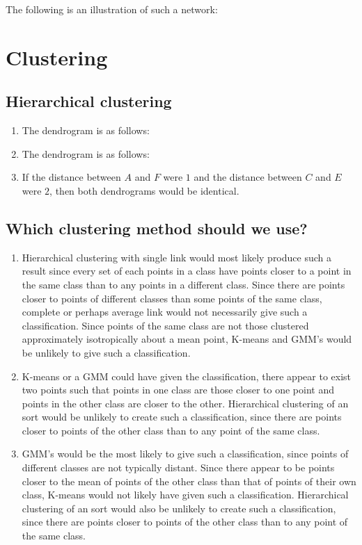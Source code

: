 \documentclass[11pt]{article}
\begin{document}
The following is an illustration of such a network:
\vspace{1.5in}

\section{Clustering}
\subsection{Hierarchical clustering}
\begin{enumerate}[1.]
\item The dendrogram is as follows:
\vspace{1.5in}

\item The dendrogram is as follows:
\vspace{1.5in}

\item If the distance between $A$ and $F$ were $1$ and the distance between
$C$ and $E$ were $2$, then both dendrograms would be identical.

\end{enumerate}

\subsection{Which clustering method should we use?}
\begin{enumerate}[1.]
\item Hierarchical clustering with single link would most likely produce such
a result since every set of each points in a class have points closer to
a point in the same class than to any points in a different class.
Since there are points closer to points of different classes than some points
of the same class, complete or perhaps average link would not necessarily give
such a classification. Since points of the same class are not those clustered
approximately isotropically about a mean point, K-means and GMM's would be
unlikely to give such a classification.

\item K-means or a GMM could have given the classification, there appear to
exist two points such that points in one class are those closer to one point
and points in the other class are closer to the other. Hierarchical clustering
of an sort would be unlikely to create such a classification, since there are
points closer to points of the other class than to any point of the same
class.

\item GMM's would be the most likely to give such a classification, since
points of different classes are not typically distant. Since there appear to
be points closer to the mean of points of the other class than that of points
of their own class, K-means would not likely have given such a classification.
Hierarchical clustering of an sort would also be unlikely to create such a
classification, since there are points closer to points of the other class
than to any point of the same class.

\end{enumerate}
\end{document}
